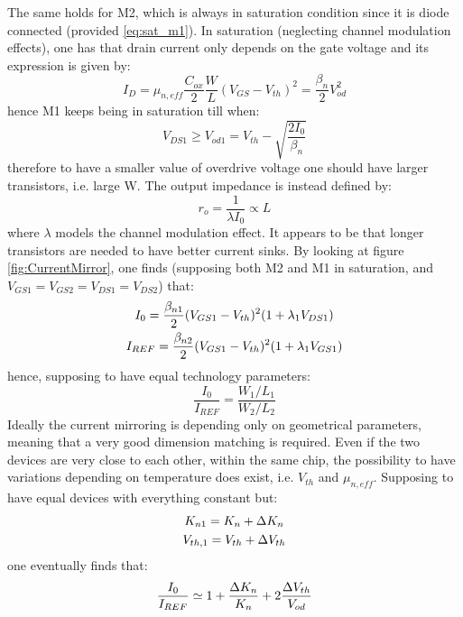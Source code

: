 The same holds for M2, which is always in saturation condition since it is diode connected (provided \ref{eq:sat_m1}). In saturation (neglecting channel modulation effects), one has that drain current only depends on the gate voltage and its expression is given by:
\begin{equation}
\label{eq:Id_quadLaw}
I_D = \mu_{n,eff} \frac{C_{ox}}{2} \frac{W}{L} (V_{GS}-V_{th})^2 = \frac{\beta_{n}}{2}V_{od}^2
\end{equation}
hence M1 keeps being in saturation till when:
\begin{equation}
V_{DS1}\geq V_{od1}= V_{th}-\sqrt{\frac{2I_0}{\beta_{n}}}
\end{equation}
therefore to have a smaller value of overdrive voltage one should have larger transistors, i.e. large W.
The output impedance is instead defined by:
\begin{equation}
 r_o = \frac{1}{\lambda I_0} \propto L
\end{equation}
where $\lambda$ models the channel modulation effect. It appears to be that longer transistors are needed to have better current sinks.
By looking at figure \ref{fig:CurrentMirror}, one finds (supposing both M2 and M1 in saturation, and $V_{GS1}=V_{GS2}=V_{DS1}=V_{DS2}$) that:
\begin{gather}
I_0 = \frac{\beta_{n1}}{2}(V_{GS1}-V_{th})^2(1+\lambda_1V_{DS1}) \notag \\
I_{REF} = \frac{\beta_{n2}}{2}(V_{GS1}-V_{th})^2(1+\lambda_1V_{GS1}) \notag
\end{gather}
hence, supposing to have equal technology parameters:
\begin{equation}
\frac{I_0}{I_{REF}} = \frac{W_1/L_1}{W_2/L_2} 
\end{equation}
Ideally the current mirroring is depending only on geometrical parameters, meaning that a very good dimension matching is required. Even if the two devices are very close to each other, within the same chip, the possibility to have variations depending on temperature does exist, i.e. $V_{th}$ and $\mu_{n,eff}$. Supposing to have equal devices with everything constant but:
\begin{gather}
K_{n1}=K_n+\Delta K_n \notag \\
V_{th,1} = V_{th}+\Delta V_{th} \notag
\end{gather}
one eventually finds that:
\begin{equation}
\frac{I_0}{I_{REF}} \simeq 1 + \frac{\Delta K_n}{K_n}+2\frac{\Delta V_{th}}{V_{od}} \notag
\end{equation}
